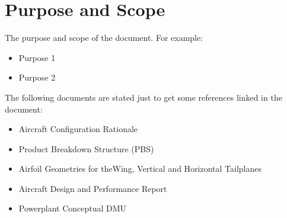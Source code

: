 \chapter{Purpose and Scope}
\label{ch:introduction}
The purpose and scope of the document. For example:


\begin{itemize}[noitemsep,topsep=3pt]
	\item Purpose 1
	\item Purpose 2
\end{itemize}

\noindent The following documents are stated just to get some references linked in the document:
\begin{itemize}[noitemsep,topsep=3pt]

		\item Aircraft Configuration Rationale \cite{AircraftConfigRationale}
\item Product Breakdown Structure (PBS) \cite{PBS}
\item Airfoil Geometries for theWing, Vertical and Horizontal Tailplanes \cite{airfoilDescription}
\item Aircraft Design and Performance Report \cite{ADPerformance}
\item Powerplant Conceptual DMU \cite{PowerplantConceptualDMU}
	
\end{itemize}
